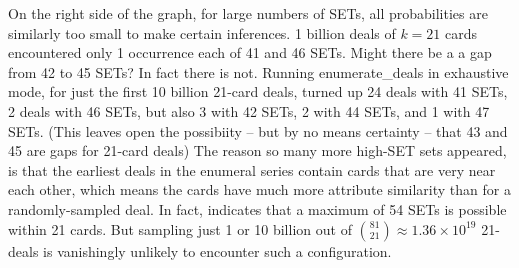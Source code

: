 \documentclass[10pt]{amsart}
\newcommand{\EDb}{{\sc enumerate\_deals }}
\begin{document}
On the right side of the graph, for large numbers of SETs, all probabilities are
similarly too small to make certain inferences. 1 billion deals of $k=21$ cards
encountered only 1 occurrence each of 41 and 46 SETs. Might there be a a gap
from 42 to 45 SETs? In fact there is not. Running \EDb in exhaustive mode, for
just the first 10 billion 21-card deals, turned up 24 deals with 41 SETs, 2
deals with 46 SETs, but also 3 with 42 SETs, 2 with 44 SETs, and 1 with 47
SETs. (This leaves open the possibiity -- but by no means certainty -- that 43
and 45 are gaps for 21-card deals) The reason so many more high-SET sets
appeared, is that the earliest deals in the enumeral series contain cards that
are very near each other, which means the cards have much more attribute
similarity than for a randomly-sampled deal. In fact, \cite{VINCI} indicates
that a maximum of 54 SETs is possible within 21 cards. But sampling just 1 or 10
billion out of $\binom{81}{21}\approx 1.36\times 10^{19}$ 21-deals is
vanishingly unlikely to encounter such a configuration.


\end{document}

